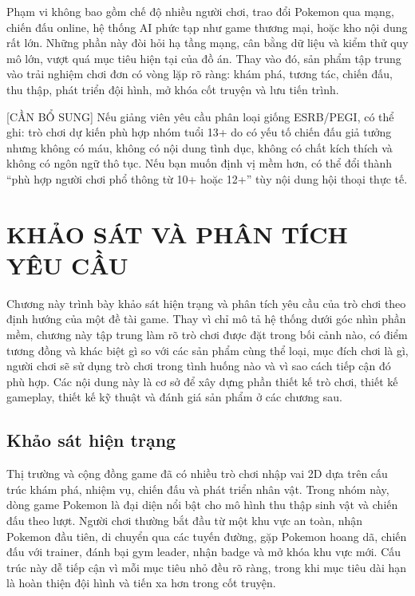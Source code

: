 Phạm vi không bao gồm chế độ nhiều người chơi, trao đổi Pokemon qua mạng, chiến đấu online, hệ thống AI phức tạp như game thương mại, hoặc kho nội dung rất lớn. Những phần này đòi hỏi hạ tầng mạng, cân bằng dữ liệu và kiểm thử quy mô lớn, vượt quá mục tiêu hiện tại của đồ án. Thay vào đó, sản phẩm tập trung vào trải nghiệm chơi đơn có vòng lặp rõ ràng: khám phá, tương tác, chiến đấu, thu thập, phát triển đội hình, mở khóa cốt truyện và lưu tiến trình.

[CẦN BỔ SUNG] Nếu giảng viên yêu cầu phân loại giống ESRB/PEGI, có thể ghi: trò chơi dự kiến phù hợp nhóm tuổi 13+ do có yếu tố chiến đấu giả tưởng nhưng không có máu, không có nội dung tình dục, không có chất kích thích và không có ngôn ngữ thô tục. Nếu bạn muốn định vị mềm hơn, có thể đổi thành ``phù hợp người chơi phổ thông từ 10+ hoặc 12+'' tùy nội dung hội thoại thực tế.

\chapter{KHẢO SÁT VÀ PHÂN TÍCH YÊU CẦU}

Chương này trình bày khảo sát hiện trạng và phân tích yêu cầu của trò chơi theo định hướng của một đề tài game. Thay vì chỉ mô tả hệ thống dưới góc nhìn phần mềm, chương này tập trung làm rõ trò chơi được đặt trong bối cảnh nào, có điểm tương đồng và khác biệt gì so với các sản phẩm cùng thể loại, mục đích chơi là gì, người chơi sẽ sử dụng trò chơi trong tình huống nào và vì sao cách tiếp cận đó phù hợp. Các nội dung này là cơ sở để xây dựng phần thiết kế trò chơi, thiết kế gameplay, thiết kế kỹ thuật và đánh giá sản phẩm ở các chương sau.

\section{Khảo sát hiện trạng}

Thị trường và cộng đồng game đã có nhiều trò chơi nhập vai 2D dựa trên cấu trúc khám phá, nhiệm vụ, chiến đấu và phát triển nhân vật. Trong nhóm này, dòng game Pokemon là đại diện nổi bật cho mô hình thu thập sinh vật và chiến đấu theo lượt. Người chơi thường bắt đầu từ một khu vực an toàn, nhận Pokemon đầu tiên, di chuyển qua các tuyến đường, gặp Pokemon hoang dã, chiến đấu với trainer, đánh bại gym leader, nhận badge và mở khóa khu vực mới. Cấu trúc này dễ tiếp cận vì mỗi mục tiêu nhỏ đều rõ ràng, trong khi mục tiêu dài hạn là hoàn thiện đội hình và tiến xa hơn trong cốt truyện.

